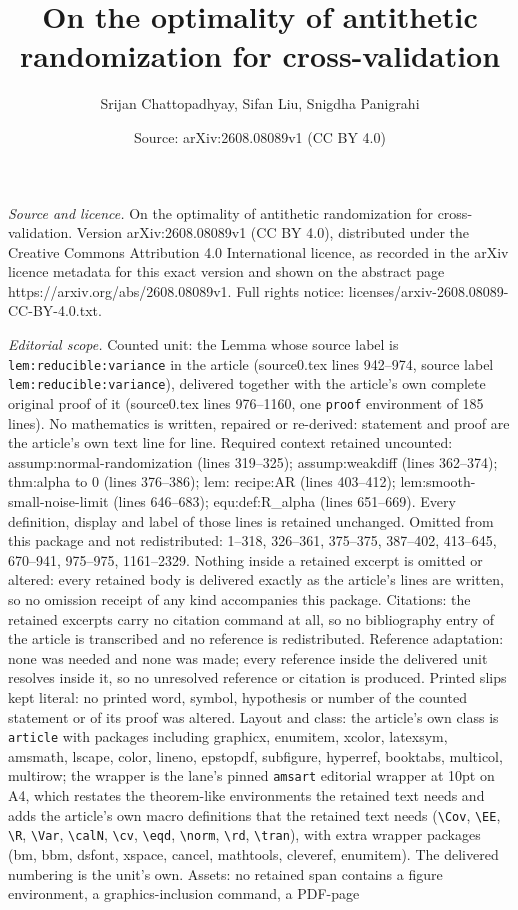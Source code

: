 \documentclass[10pt,a4paper]{amsart}
\title[On the optimality of antithetic randomization for cross-vali]{On the optimality of antithetic randomization for cross-validation}
\author{Srijan Chattopadhyay, Sifan Liu, Snigdha Panigrahi}
\date{Source: arXiv:2608.08089v1 (CC BY 4.0)}
\begin{document}
\maketitle

\noindent\emph{Source and licence.} On the optimality of antithetic randomization for cross-validation. Version arXiv:2608.08089v1 (CC BY 4.0), distributed under the Creative Commons Attribution 4.0 International licence, as recorded in the arXiv licence metadata for this exact version and shown on the abstract page https://arxiv.org/abs/2608.08089v1. Full rights notice: licenses/arxiv-2608.08089-CC-BY-4.0.txt.\par\smallskip

\noindent\textit{Editorial scope.} Counted unit: the Lemma whose source label is \texttt{lem:reducible:variance} in the article (source0.tex lines 942--974, source label \texttt{lem:reducible:variance}), delivered together with the article's own complete original proof of it (source0.tex lines 976--1160, one \texttt{proof} environment of 185 lines). No mathematics is written, repaired or re-derived: statement and proof are the article's own text line for line. Required context retained uncounted: assump:normal-randomization (lines 319--325); assump:weakdiff (lines 362--374); thm:alpha to 0 (lines 376--386); lem: recipe:AR (lines 403--412); lem:smooth-small-noise-limit (lines 646--683); equ:def:R\_alpha (lines 651--669). Every definition, display and label of those lines is retained unchanged. Omitted from this package and not redistributed: 1--318, 326--361, 375--375, 387--402, 413--645, 670--941, 975--975, 1161--2329. Nothing inside a retained excerpt is omitted or altered: every retained body is delivered exactly as the article's lines are written, so no omission receipt of any kind accompanies this package. Citations: the retained excerpts carry no citation command at all, so no bibliography entry of the article is transcribed and no reference is redistributed. Reference adaptation: none was needed and none was made; every reference inside the delivered unit resolves inside it, so no unresolved reference or citation is produced. Printed slips kept literal: no printed word, symbol, hypothesis or number of the counted statement or of its proof was altered. Layout and class: the article's own class is \texttt{article} with packages including graphicx, enumitem, xcolor, latexsym, amsmath, lscape, color, lineno, epstopdf, subfigure, hyperref, booktabs, multicol, multirow; the wrapper is the lane's pinned \texttt{amsart} editorial wrapper at 10pt on A4, which restates the theorem-like environments the retained text needs and adds the article's own macro definitions that the retained text needs (\texttt{\textbackslash Cov}, \texttt{\textbackslash EE}, \texttt{\textbackslash R}, \texttt{\textbackslash Var}, \texttt{\textbackslash calN}, \texttt{\textbackslash cv}, \texttt{\textbackslash eqd}, \texttt{\textbackslash norm}, \texttt{\textbackslash rd}, \texttt{\textbackslash tran}), with extra wrapper packages (bm, bbm, dsfont, xspace, cancel, mathtools, cleveref, enumitem). The delivered numbering is the unit's own. Assets: no retained span contains a figure environment, a graphics-inclusion command, a PDF-page 
\end{document}

